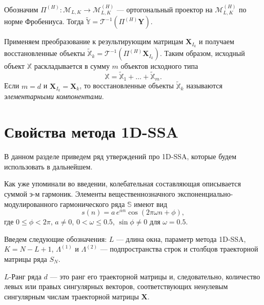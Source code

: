 \documentclass[specialist,
               substylefile = spbu.rtx,
               subf,href,colorlinks=true, 12pt]{disser}
\begin{document}
Обозначим $\Pi^{(H)}: \mathcal{M}_{L,K} \rightarrow \mathcal{M}_{L,K}^{(H)}$ --- ортогональный проектор на $\mathcal{M}_{L,K}^{(H)}$ по норме Фробениуса. Тогда $\widetilde{\mathbb{Y}} = \mathcal{T}^{-1}\left( \Pi^{(H)} \mathbf{Y}\right)$.

Применяем преобразование к результирующим матрицам $\mathbf{X}_{I_k}$ и получаем восстановленные объекты $\widetilde{\mathbb{X}}_k =\mathcal{T}^{-1}\left( \Pi^{(H)} \mathbf{X}_{I_k}\right)$. Таким образом, исходный объект $\mathbb{X}$ раскладывается в сумму $m$ объектов исходного типа
\begin{equation*}
\mathbb{X} = \widetilde{\mathbb{X}}_1 + \ldots + \widetilde{\mathbb{X}}_m.
\end{equation*}
Если $m = d$ и $\mathbf{X}_{I_k} = \mathbf{X}_k$, то восстановленные объекты $\widetilde{\mathbb{X}}_k$ называются \textit{элементарными компонентами}.

\section{Свойства метода 1D-SSA}
\label{sec:1d_ssa_theory}
В данном разделе приведем ряд утверждений про 1D-SSA, которые будем использовать в дальнейшем.

Как уже упоминали во введении, колебательная составляющая описывается суммой э-м гармоник.
Элементы вещественнозначного экспоненциально-модулированного гармонического ряда $\mathbb{S}$ имеют вид
\begin{equation} \label{eq:ex_mod_garm_1d}
 s(n) = a\, e^{\alpha n} \cos(2\pi\omega n + \phi),
\end{equation}
где $0 \leqslant \phi < 2\pi$, $a \not = 0$, $0<\omega \leqslant 0.5$, $\sin \phi \not = 0$ для $\omega = 0.5$.

Введем следующие обозначения: $L$ --- длина окна, параметр метода 1D-SSA, $K=N-L+1$, $\Lambda^{(1)}$ и $\Lambda^{(2)}$ --- подпространства строк и столбцов траекторной матрицы ряда $S_N$.

$L$-Ранг ряда $d$ --- это ранг его траекторной матрицы и, следовательно, количество левых или правых сингулярных векторов, соответствующих ненулевым сингулярным числам траекторной матрицы $\mathbf{X}$.

\end{document}
